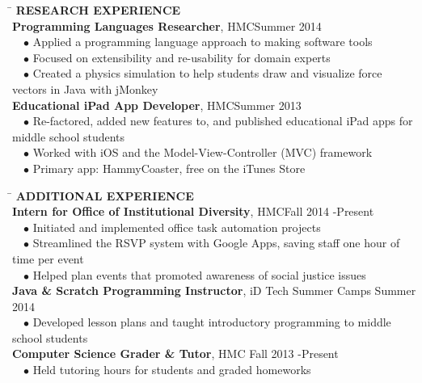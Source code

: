 \documentclass[11pt]{article}
\newcommand{\sectionNL}{\\[-2pt]}
\newcommand{\customtab}{$\hspace{10pt} \bullet \hspace{2pt}$}
\newcommand{\customtabinline}{$\hspace{23pt}$}
\newcommand{\HMC}{HMC}
\begin{document}
\begin{tabbing} 
\hspace*{6.5in}\= \kill
{\textbf{RESEARCH EXPERIENCE} } \> \sectionNL
\textbf{Programming Languages Researcher}, \HMC \>Summer 2014 \\
\customtab Applied a programming language approach to making software tools \\
\customtab Focused on extensibility and re-usability for domain experts \\ 
\customtab Created a physics simulation to help students draw and visualize force vectors in Java with jMonkey\\

\textbf{Educational iPad App Developer}, \HMC \>Summer 2013 \\
\customtab Re-factored, added new features to, and published educational iPad apps for middle school students \\
\customtab Worked with iOS and the Model-View-Controller (MVC) framework \\
\customtab Primary app: HammyCoaster, free on the iTunes Store
\end{tabbing}


\begin{tabbing} 
\hspace*{6.5in}\= \kill
{\textbf{ADDITIONAL EXPERIENCE } } \> \sectionNL
\textbf{Intern for Office of Institutional Diversity}, \HMC \>Fall 2014 -Present \\
\customtab Initiated and implemented office task automation projects\\
\customtab Streamlined the RSVP system with Google Apps, saving staff one hour of time per event  \\
\customtab Helped plan events that promoted awareness of social justice issues \\

\textbf{Java \& Scratch Programming Instructor}, iD Tech Summer Camps \> Summer 2014 \\
\customtab Developed lesson plans and taught introductory programming to  middle school students\\

\textbf{Computer Science Grader \& Tutor}, \HMC \> Fall 2013 -Present \\ %
\customtab Held tutoring hours for students and graded homeworks
\end{tabbing}
\end{document}
